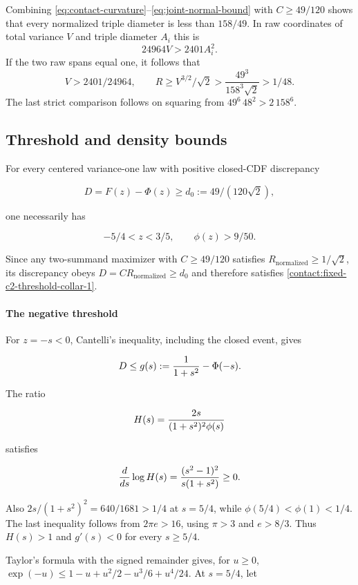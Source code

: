 Combining \eqref{eq:contact-curvature}--\eqref{eq:joint-normal-bound}
with $C\ge49/120$ shows that every normalized triple diameter is less
than $158/49$. In raw coordinates of total variance $V$ and triple
diameter $A_i$ this is
\begin{equation}\label{eq:raw-triple-diameter}
 24964V>2401A_i^2.
\end{equation}
If the two raw spans equal one, it follows that
\[
 V>2401/24964,
 \qquad R\ge V^{3/2}/\sqrt2>\frac{49^3}{158^3\sqrt2}>1/48.
\]
The last strict comparison follows on squaring from
$49^6\,48^2>2\,158^6$.
\subsection{Threshold and density bounds}\label{contact:fixed-c2-threshold-collar}


For every centered variance-one law with positive closed-CDF discrepancy

\[
 D=F(z)-\Phi(z)\ge d_0:=49/(120\sqrt2),
\]

one necessarily has

\[
 \boxed{-5/4<z<3/5,\qquad \phi(z)>9/50.}
\tag{B.3.1}\label{contact:fixed-c2-threshold-collar-1}
\]

Since any two-summand maximizer with $C\ge49/120$ satisfies
$R_{\mathrm{normalized}}\ge1/\sqrt2$, its discrepancy obeys $D=CR_{\mathrm{normalized}}\ge d_0$
and therefore satisfies \eqref{contact:fixed-c2-threshold-collar-1}.

\paragraph{The negative threshold}

For $z=-s<0$, Cantelli's inequality, including the closed event, gives

\[
 D\le g(s):={1\over1+s^2}-\Phi(-s).
\]

The ratio

\[
 H(s)={2s\over(1+s^2)^2\phi(s)}
\]

satisfies

\[
 {d\over ds}\log H(s)={(s^2-1)^2\over s(1+s^2)}\ge0.
\]

Also $2s/(1+s^2)^2=640/1681>1/4$ at $s=5/4$, while
$\phi(5/4)<\phi(1)<1/4$. The last inequality follows from $2 \pi e>16$, using
$\pi>3$ and $e>8/3$. Thus $H(s)>1$ and $g'(s)<0$ for every $s\ge 5/4$.

Taylor's formula with the signed remainder gives, for $u\ge 0$,
$\exp(-u)\le 1-u+u^2/2-u^3/6+u^4/24$. At $s=5/4$, let

